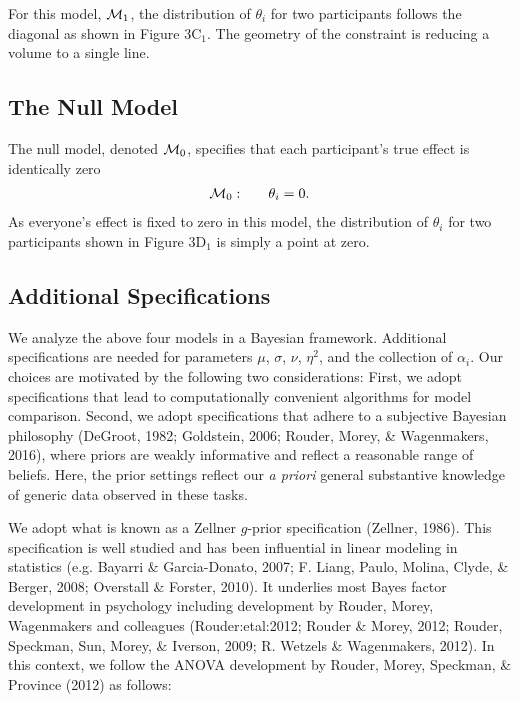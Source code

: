 \documentclass[american,man]{apa6}
\begin{document}
For this model, \({\cal M}_1\), the distribution of \(\theta_i\) for two
participants follows the diagonal as shown in Figure 3\(\mbox{C}_1\).
The geometry of the constraint is reducing a volume to a single line.

\subsection{The Null Model}\label{the-null-model}

The null model, denoted \({\cal M}_0\), specifies that each participant's
true effect is identically zero \[
  \begin{array}{llr}
{\cal M}_0: & & \theta_i = 0.\\
  \end{array}
\] As everyone's effect is fixed to zero in this model, the distribution
of \(\theta_i\) for two participants shown in Figure 3\(\mbox{D}_1\) is
simply a point at zero.

\subsection{Additional Specifications}\label{additional-specifications}

We analyze the above four models in a Bayesian framework. Additional
specifications are needed for parameters \(\mu\), \(\sigma\), \(\nu\),
\(\eta^2\), and the collection of \(\alpha_i\). Our choices are
motivated by the following two considerations: First, we adopt
specifications that lead to computationally convenient algorithms for
model comparison. Second, we adopt specifications that adhere to a
subjective Bayesian philosophy (DeGroot, 1982; Goldstein, 2006; Rouder,
Morey, \& Wagenmakers, 2016), where priors are weakly informative and
reflect a reasonable range of beliefs. Here, the prior settings reflect
our \emph{a priori} general substantive knowledge of generic data
observed in these tasks.

We adopt what is known as a Zellner \(g\)-prior specification (Zellner,
1986). This specification is well studied and has been influential in
linear modeling in statistics (e.g. Bayarri \& Garcia-Donato, 2007; F.
Liang, Paulo, Molina, Clyde, \& Berger, 2008; Overstall \& Forster,
2010). It underlies most Bayes factor development in psychology
including development by Rouder, Morey, Wagenmakers and colleagues
(Rouder:etal:2012; Rouder \& Morey, 2012; Rouder, Speckman, Sun, Morey,
\& Iverson, 2009; R. Wetzels \& Wagenmakers, 2012). In this context, we
follow the ANOVA development by Rouder, Morey, Speckman, \& Province
(2012) as follows:
\end{document}
